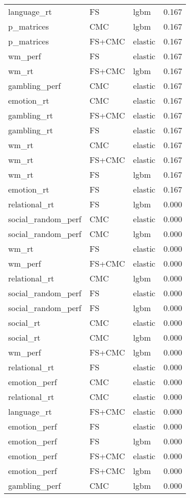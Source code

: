 \documentclass{article}
\begin{document}
\begin{table}
\begin{tabular}{lllr}
language\_rt & FS & lgbm & 0.167 \\
p\_matrices & CMC & lgbm & 0.167 \\
p\_matrices & FS+CMC & elastic & 0.167 \\
wm\_perf & FS & elastic & 0.167 \\
wm\_rt & FS+CMC & lgbm & 0.167 \\
gambling\_perf & CMC & elastic & 0.167 \\
emotion\_rt & CMC & elastic & 0.167 \\
gambling\_rt & FS+CMC & elastic & 0.167 \\
gambling\_rt & FS & elastic & 0.167 \\
wm\_rt & CMC & elastic & 0.167 \\
wm\_rt & FS+CMC & elastic & 0.167 \\
wm\_rt & FS & lgbm & 0.167 \\
emotion\_rt & FS & elastic & 0.167 \\
relational\_rt & FS & lgbm & 0.000 \\
social\_random\_perf & CMC & elastic & 0.000 \\
social\_random\_perf & CMC & lgbm & 0.000 \\
wm\_rt & FS & elastic & 0.000 \\
wm\_perf & FS+CMC & elastic & 0.000 \\
relational\_rt & CMC & lgbm & 0.000 \\
social\_random\_perf & FS & elastic & 0.000 \\
social\_random\_perf & FS & lgbm & 0.000 \\
social\_rt & CMC & elastic & 0.000 \\
social\_rt & CMC & lgbm & 0.000 \\
wm\_perf & FS+CMC & lgbm & 0.000 \\
relational\_rt & FS & elastic & 0.000 \\
emotion\_perf & CMC & elastic & 0.000 \\
relational\_rt & CMC & elastic & 0.000 \\
language\_rt & FS+CMC & elastic & 0.000 \\
emotion\_perf & FS & elastic & 0.000 \\
emotion\_perf & FS & lgbm & 0.000 \\
emotion\_perf & FS+CMC & elastic & 0.000 \\
emotion\_perf & FS+CMC & lgbm & 0.000 \\
gambling\_perf & CMC & lgbm & 0.000 \\

\end{tabular}
\end{table}
\end{document}
